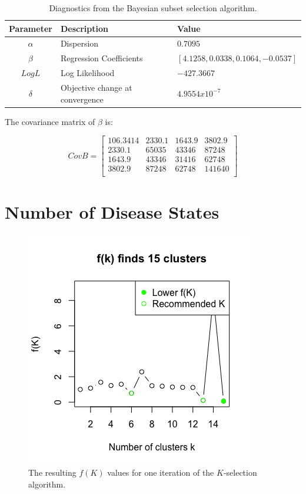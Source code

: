 \documentclass{article}
\begin{document}
\begin{table}[htbp] \centering
\label{SubsetParameters}
 \begin{tabular}{|c|l|l|} \hline
  \textbf{Parameter} & \textbf{Description} & \textbf{Value} \\\hline
  $\alpha$ & Dispersion & $0.7095$ \\\hline
  $\beta$ & Regression Coefficients & $[4.1258, 0.0338, 0.1064, -0.0537]$ \\\hline
  $LogL$ & Log Likelihood & $-427.3667$ \\\hline
  $\delta$ & Objective change at convergence & $4.9554 x 10^{-7}$ \\\hline
 \end{tabular}
 \caption{Diagnostics from the Bayesian subset selection algorithm.}
\end{table}

The covariance matrix of $\beta$ is:

\[ CovB = 
\begin{bmatrix}
 106.3414 & 2330.1 & 1643.9 & 3802.9 \\
 2330.1 & 65035 & 43346 & 87248 \\
 1643.9 & 43346 & 31416 & 62748 \\
 3802.9 & 87248 & 62748 & 141640 \\
\end{bmatrix}
\]

\pagebreak
\section*{Number of Disease States}
\begin{figure}[htbp] \centering
 \label{KClusters}
 \includegraphics[scale=1]{figures/Kselection_15.png}
 \caption{The resulting $f(K)$ values for one iteration of the $K$-selection algorithm.}
\end{figure}
\end{document}
